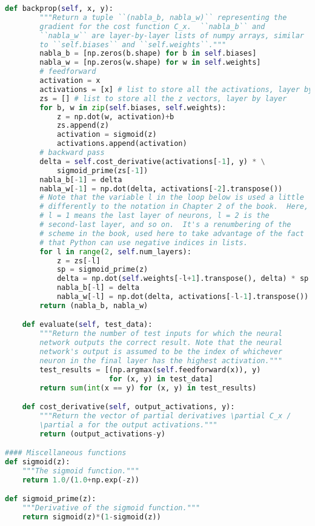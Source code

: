 \begin{fullwidth}
\begin{lstlisting}[caption={network.py (Python 3.7.1)},label={lst:network.py}, language=Python]
    def backprop(self, x, y):
        """Return a tuple ``(nabla_b, nabla_w)`` representing the
        gradient for the cost function C_x.  ``nabla_b`` and
        ``nabla_w`` are layer-by-layer lists of numpy arrays, similar
        to ``self.biases`` and ``self.weights``."""
        nabla_b = [np.zeros(b.shape) for b in self.biases]
        nabla_w = [np.zeros(w.shape) for w in self.weights]
        # feedforward
        activation = x
        activations = [x] # list to store all the activations, layer by layer
        zs = [] # list to store all the z vectors, layer by layer
        for b, w in zip(self.biases, self.weights):
            z = np.dot(w, activation)+b
            zs.append(z)
            activation = sigmoid(z)
            activations.append(activation)
        # backward pass
        delta = self.cost_derivative(activations[-1], y) * \
            sigmoid_prime(zs[-1])
        nabla_b[-1] = delta
        nabla_w[-1] = np.dot(delta, activations[-2].transpose())
        # Note that the variable l in the loop below is used a little
        # differently to the notation in Chapter 2 of the book.  Here,
        # l = 1 means the last layer of neurons, l = 2 is the
        # second-last layer, and so on.  It's a renumbering of the
        # scheme in the book, used here to take advantage of the fact
        # that Python can use negative indices in lists.
        for l in range(2, self.num_layers):
            z = zs[-l]
            sp = sigmoid_prime(z)
            delta = np.dot(self.weights[-l+1].transpose(), delta) * sp
            nabla_b[-l] = delta
            nabla_w[-l] = np.dot(delta, activations[-l-1].transpose())
        return (nabla_b, nabla_w)

    def evaluate(self, test_data):
        """Return the number of test inputs for which the neural
        network outputs the correct result. Note that the neural
        network's output is assumed to be the index of whichever
        neuron in the final layer has the highest activation."""
        test_results = [(np.argmax(self.feedforward(x)), y)
                        for (x, y) in test_data]
        return sum(int(x == y) for (x, y) in test_results)

    def cost_derivative(self, output_activations, y):
        """Return the vector of partial derivatives \partial C_x /
        \partial a for the output activations."""
        return (output_activations-y)

#### Miscellaneous functions
def sigmoid(z):
    """The sigmoid function."""
    return 1.0/(1.0+np.exp(-z))

def sigmoid_prime(z):
    """Derivative of the sigmoid function."""
    return sigmoid(z)*(1-sigmoid(z))
\end{lstlisting}
\end{fullwidth}

